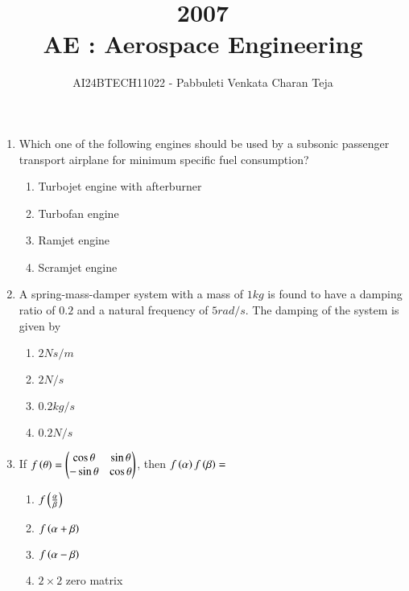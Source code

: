 \documentclass[journal,12pt,twocolumn]{IEEEtran}
\theoremstyle{remark}
\begin{document}

\vspace{3cm}

\title{2007\\AE : Aerospace Engineering}
\author{AI24BTECH11022 - Pabbuleti Venkata Charan Teja}
\maketitle
\newpage
\bigskip

\renewcommand{\thefigure}{\theenumi}
\renewcommand{\thetable}{\theenumi}


\begin{enumerate}
\item Which one of the following engines should be used by a subsonic passenger transport airplane for minimum specific fuel consumption?
\begin{enumerate}
\item Turbojet engine with afterburner
\item Turbofan engine 
\item Ramjet engine
\item Scramjet engine
\end{enumerate}


\item A spring-mass-damper system with a mass of $1kg$ is found to have a damping ratio of $0.2$ and a natural frequency of $5rad/s$. The damping of the system is given by
\begin{multicols}{2}
\begin{enumerate}
\item $2Ns/m$
\item $2N/s$
\item $0.2kg/s$
\item $0.2N/s$
\end{enumerate}
\end{multicols}


\item If $f\left(\theta\right)=\begin{pmatrix}\cos{\theta}&\sin{\theta}\\ -\sin{\theta}&\cos{\theta}\end{pmatrix}$, then $f\left(\alpha\right)f\left(\beta\right)=$
\begin{multicols}{2}
\begin{enumerate}
\item $f\left(\frac{\alpha}{\beta}\right)$
\item $f\left(\alpha+\beta\right)$
\item $f\left(\alpha-\beta\right)$
\item $2\times 2$ zero matrix 
\end{enumerate}
\end{multicols}



\end{enumerate}
\end{document}
